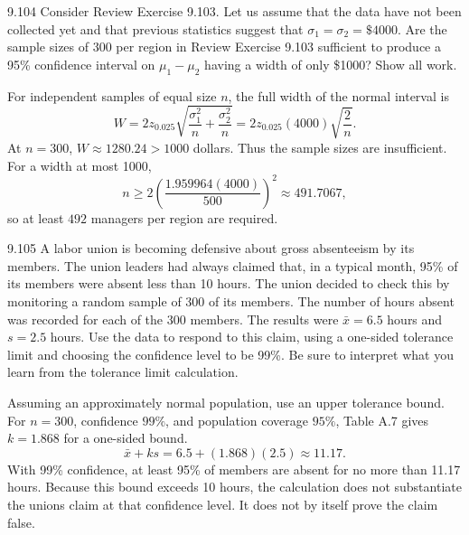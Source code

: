 \documentclass[11pt,oneside]{article}
\begin{document}
\begin{exercise}{9.104}
Consider Review Exercise 9.103. Let us assume that the data have not been collected yet and that previous statistics suggest that $\sigma_1=\sigma_2=\$4000$. Are the sample sizes of 300 per region in Review Exercise 9.103 sufficient to produce a 95\% confidence interval on $\mu_1-\mu_2$ having a width of only \$1000? Show all work.
\end{exercise}
\begin{solution}
For independent samples of equal size $n$, the full width of the normal interval is
\[
W=2z_{0.025}\sqrt{\frac{\sigma_1^2}{n}+\frac{\sigma_2^2}{n}}=2z_{0.025}(4000)\sqrt{\frac2n}.
\]
At $n=300$, $W\approx 1280.24>1000$ dollars. Thus the sample sizes are insufficient. For a width at most 1000, 
\[
n\ge 2\left(\frac{1.959964(4000)}{500}\right)^2\approx 491.7067,
\]
so at least $\boxed{492}$ managers per region are required.
\end{solution}

\begin{exercise}{9.105}
A labor union is becoming defensive about gross absenteeism by its members. The union leaders had always claimed that, in a typical month, 95\% of its members were absent less than 10 hours. The union decided to check this by monitoring a random sample of 300 of its members. The number of hours absent was recorded for each of the 300 members. The results were $\bar x=6.5$ hours and $s=2.5$ hours. Use the data to respond to this claim, using a one-sided tolerance limit and choosing the confidence level to be 99\%. Be sure to interpret what you learn from the tolerance limit calculation.
\end{exercise}
\begin{solution}
Assuming an approximately normal population, use an upper tolerance bound. For $n=300$, confidence $99\%$, and population coverage $95\%$, Table A.7 gives $k=1.868$ for a one-sided bound.
\[
\bar x+ks=6.5+(1.868)(2.5)\approx\boxed{11.17}.
\]
With 99\% confidence, at least 95\% of members are absent for no more than 11.17 hours. Because this bound exceeds 10 hours, the calculation does not substantiate the union\textquotesingle s claim at that confidence level. It does not by itself prove the claim false.
\end{solution}
\end{document}
